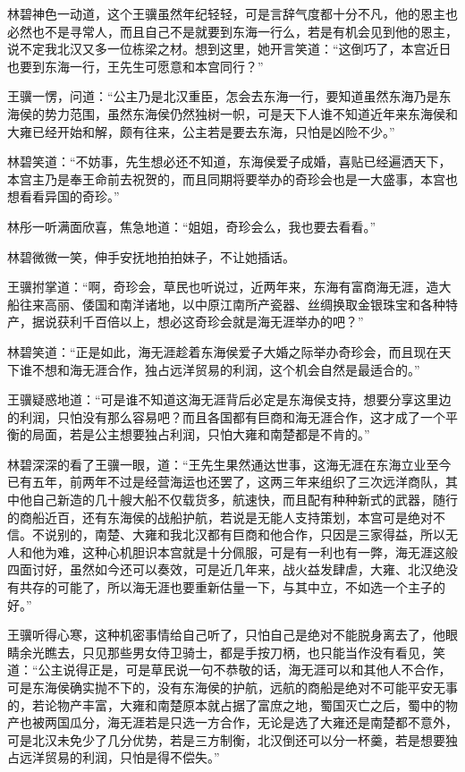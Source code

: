 林碧神色一动道，这个王骥虽然年纪轻轻，可是言辞气度都十分不凡，他的恩主也必然也不是寻常人，而且自己不是就要到东海一行么，若是有机会见到他的恩主，说不定我北汉又多一位栋梁之材。想到这里，她开言笑道：“这倒巧了，本宫近日也要到东海一行，王先生可愿意和本宫同行？”

王骥一愣，问道：“公主乃是北汉重臣，怎会去东海一行，要知道虽然东海乃是东海侯的势力范围，虽然东海侯仍然独树一帜，可是天下人谁不知道近年来东海侯和大雍已经开始和解，颇有往来，公主若是要去东海，只怕是凶险不少。”

林碧笑道：“不妨事，先生想必还不知道，东海侯爱子成婚，喜贴已经遍洒天下，本宫主乃是奉王命前去祝贺的，而且同期将要举办的奇珍会也是一大盛事，本宫也想看看异国的奇珍。”

林彤一听满面欣喜，焦急地道：“姐姐，奇珍会么，我也要去看看。”

林碧微微一笑，伸手安抚地拍拍妹子，不让她插话。

王骥拊掌道：“啊，奇珍会，草民也听说过，近两年来，东海有富商海无涯，造大船往来高丽、倭国和南洋诸地，以中原江南所产瓷器、丝绸换取金银珠宝和各种特产，据说获利千百倍以上，想必这奇珍会就是海无涯举办的吧？”

林碧笑道：“正是如此，海无涯趁着东海侯爱子大婚之际举办奇珍会，而且现在天下谁不想和海无涯合作，独占远洋贸易的利润，这个机会自然是最适合的。”

王骥疑惑地道：“可是谁不知道这海无涯背后必定是东海侯支持，想要分享这里边的利润，只怕没有那么容易吧？而且各国都有巨商和海无涯合作，这才成了一个平衡的局面，若是公主想要独占利润，只怕大雍和南楚都是不肯的。”

林碧深深的看了王骥一眼，道：“王先生果然通达世事，这海无涯在东海立业至今已有五年，前两年不过是经营海运也还罢了，这两三年来组织了三次远洋商队，其中他自己新造的几十艘大船不仅载货多，航速快，而且配有种种新式的武器，随行的商船近百，还有东海侯的战船护航，若说是无能人支持策划，本宫可是绝对不信。不说别的，南楚、大雍和我北汉都有巨商和他合作，只因是三家得益，所以无人和他为难，这种心机胆识本宫就是十分佩服，可是有一利也有一弊，海无涯这般四面讨好，虽然如今还可以奏效，可是近几年来，战火益发肆虐，大雍、北汉绝没有共存的可能了，所以海无涯也要重新估量一下，与其中立，不如选一个主子的好。”

王骥听得心寒，这种机密事情给自己听了，只怕自己是绝对不能脱身离去了，他眼睛余光瞧去，只见那些男女侍卫骑士，都是手按刀柄，也只能当作没有看见，笑道：“公主说得正是，可是草民说一句不恭敬的话，海无涯可以和其他人不合作，可是东海侯确实抛不下的，没有东海侯的护航，远航的商船是绝对不可能平安无事的，若论物产丰富，大雍和南楚原本就占据了富庶之地，蜀国灭亡之后，蜀中的物产也被两国瓜分，海无涯若是只选一方合作，无论是选了大雍还是南楚都不意外，可是北汉未免少了几分优势，若是三方制衡，北汉倒还可以分一杯羹，若是想要独占远洋贸易的利润，只怕是得不偿失。”

